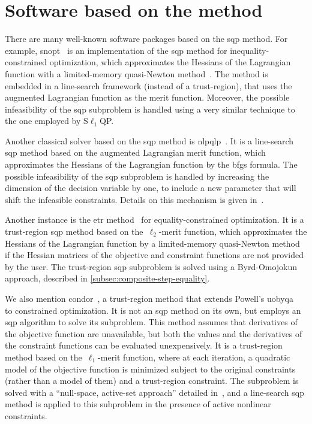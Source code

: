 \section{Software based on the  method}
\label{sec:existing-sqp-software}

There are many well-known software packages based on the \gls{sqp} method.
For example, \gls{snopt}~\cite{Gill_Murray_Saunders_2002,Gill_Murray_Saunders_2005} is an implementation of the \gls{sqp} method for inequality-constrained optimization, which approximates the Hessians of the Lagrangian function with a limited-memory quasi-Newton method~\cite{Buckley_Lenir_1978,Liu_Nocedal_1989,Gilbert_Nocedal_1993}.
The method is embedded in a line-search framework (instead of a trust-region), that uses the augmented Lagrangian function as the merit function.
Moreover, the possible infeasibility of the \gls{sqp} subproblem is handled using a very similar technique to the one employed by S$\ell_1$QP.

Another classical solver based on the \gls{sqp} method is \gls{nlpqlp}~\cite{Schittkowski_2015}.
It is a line-search \gls{sqp} method based on the augmented Lagrangian merit function, which approximates the Hessians of the Lagrangian function by the \gls{bfgs} formula.
The possible infeasibility of the \gls{sqp} subproblem is handled by increasing the dimension of the decision variable by one, to include a new parameter that will shift the infeasible constraints.
Details on this mechanism is given in~\cite[Eq.~(9)]{Schittkowski_1986}.

Another instance is the \gls{etr} method~\cite{Lalee_Nocedal_Plantenga_1998} for equality-constrained optimization.
It is a trust-region \gls{sqp} method based on the~$\ell_2$-merit function, which approximates the Hessians of the Lagrangian function by a limited-memory quasi-Newton method if the Hessian matrices of the objective and constraint functions are not provided by the user.
The trust-region \gls{sqp} subproblem is solved using a Byrd-Omojokun approach, described in \cref{subsec:composite-step-equality}.

We also mention \gls{condor}~\cite{Berghen_2004,Berghen_Bersini_2004}, a trust-region method that extends Powell's \gls{uobyqa}~\cite{Powell_2002} to constrained optimization.
It is not an \gls{sqp} method on its own, but employs an \gls{sqp} algorithm to solve its subproblem.
This method assumes that derivatives of the objective function are unavailable, but both the values and the derivatives of the constraint functions can be evaluated unexpensively.
It is a trust-region method based on the~$\ell_1$-merit function, where at each iteration, a quadratic model of the objective function is minimized subject to the original constraints (rather than a model of them) and a trust-region constraint.
The subproblem is solved with a \enquote{null-space, active-set approach} detailed in~\cite[\S~9.3]{Berghen_2004}, and a line-search \gls{sqp} method is applied to this subproblem in the presence of active nonlinear constraints.


